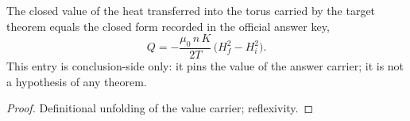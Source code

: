 \begin{theorem}
\label{thm:IPhO2026Problems_problem_IPhO_2026_3_B_1:OfficialAnswerValue}
The closed value of the heat transferred into the torus carried by the
target theorem equals the closed form recorded in the official answer key,
\[
Q = -\frac{\mu_0\,n\,K}{2 T}\,\bigl(H_f^2 - H_i^2\bigr).
\]
This entry is conclusion-side only: it pins the value of the answer
carrier; it is not a hypothesis of any theorem.
\end{theorem}
\begin{proof}
Definitional unfolding of the value carrier; reflexivity.
\end{proof}
